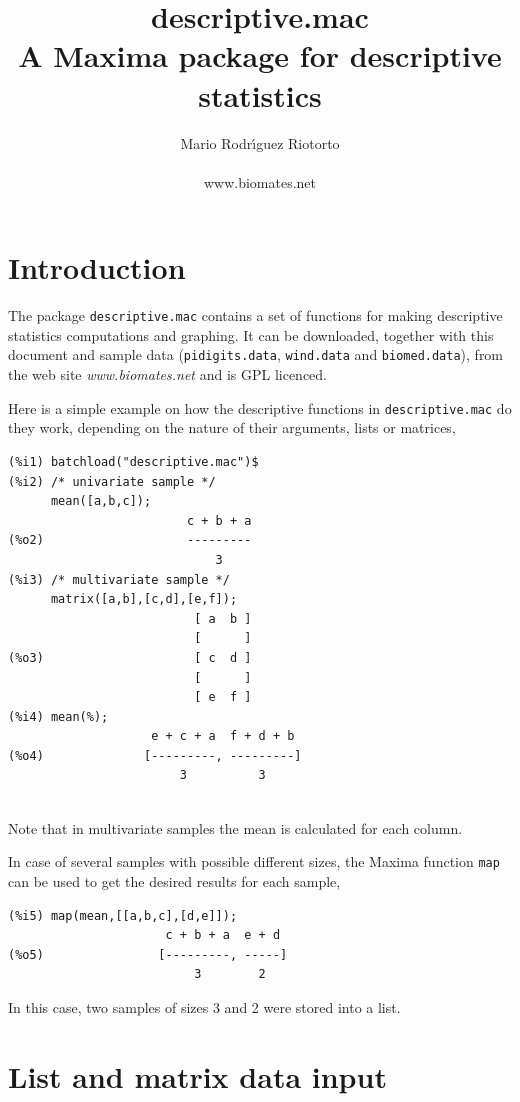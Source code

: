 \documentclass[12pt,a4paper]{article}
\title{\textbf{\Huge{descriptive.mac}\\
                       \large{A Maxima package for descriptive statistics}}}
\author{\Large{Mario Rodr\'{\i}guez Riotorto}\\
	  \\
	  www.biomates.net\\
	  }
\begin{document}
\maketitle
\tableofcontents

\section{Introduction}

The package \verb|descriptive.mac| contains a set of functions for making descriptive statistics computations and graphing. It can be downloaded, together with this document and sample data (\verb|pidigits.data|, \verb|wind.data| and \verb|biomed.data|), from the web site \emph{www.biomates.net} and is GPL licenced.

Here is a simple example on how the descriptive functions in \verb|descriptive.mac| do they work, depending on the nature of their arguments, lists or matrices,
\begin{verbatim}
(%i1) batchload("descriptive.mac")$
(%i2) /* univariate sample */
      mean([a,b,c]);
                         c + b + a
(%o2)                    ---------
                             3
(%i3) /* multivariate sample */
      matrix([a,b],[c,d],[e,f]);
                          [ a  b ]
                          [      ]
(%o3)                     [ c  d ]
                          [      ]
                          [ e  f ]
(%i4) mean(%);
                    e + c + a  f + d + b
(%o4)              [---------, ---------]
                        3          3


\end{verbatim}
Note that in multivariate samples the mean is calculated for each column.

In case of several samples with possible different sizes, the Maxima function \verb|map| can be used to get the desired results for each sample,
\begin{verbatim}
(%i5) map(mean,[[a,b,c],[d,e]]);
                      c + b + a  e + d
(%o5)                [---------, -----]
                          3        2
\end{verbatim}
In this case, two samples of sizes 3 and 2 were stored into a list.

\section{List and matrix data input}
\end{document}
